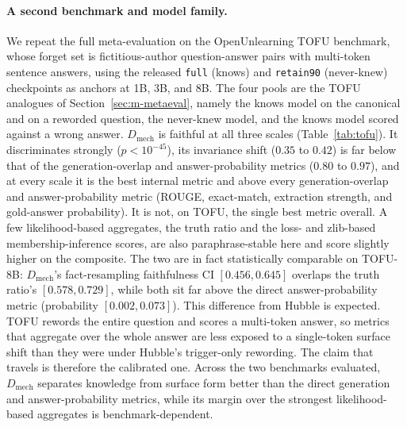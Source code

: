 \paragraph{A second benchmark and model family.}
We repeat the full meta-evaluation on the OpenUnlearning TOFU benchmark, whose forget set is
fictitious-author question-answer pairs with multi-token sentence answers, using the released \texttt{full}
(knows) and \texttt{retain90} (never-knew) checkpoints as anchors at 1B, 3B, and 8B. The four pools are the
TOFU analogues of Section~\ref{sec:m-metaeval}, namely the knows model on the canonical and on a reworded question,
the never-knew model, and the knows model scored against a wrong answer. $D_\text{mech}$ is faithful at all
three scales (Table~\ref{tab:tofu}). It discriminates strongly ($p<10^{-45}$), its invariance shift
($0.35$ to $0.42$) is far below that of the generation-overlap and answer-probability metrics ($0.80$ to
$0.97$), and at every scale it is the best internal metric and above every generation-overlap and
answer-probability metric (ROUGE, exact-match, extraction strength, and gold-answer probability). It is not,
on TOFU, the single best metric overall. A few likelihood-based aggregates, the truth ratio and the loss-
and zlib-based membership-inference scores, are also paraphrase-stable here and score slightly higher on the
composite. The two are in fact statistically comparable on TOFU-8B: $D_\text{mech}$'s fact-resampling
faithfulness CI $[0.456, 0.645]$ overlaps the truth ratio's $[0.578, 0.729]$, while both sit far above the
direct answer-probability metric (probability $[0.002, 0.073]$). This difference from Hubble is expected.
TOFU rewords the entire question and scores a multi-token answer, so metrics that aggregate over the whole
answer are less exposed to a single-token surface shift than they were under Hubble's trigger-only rewording.
The claim that travels is therefore the calibrated one. Across the two benchmarks evaluated, $D_\text{mech}$
separates knowledge from surface form better than the direct generation and answer-probability metrics,
while its margin over the strongest likelihood-based aggregates is benchmark-dependent.

